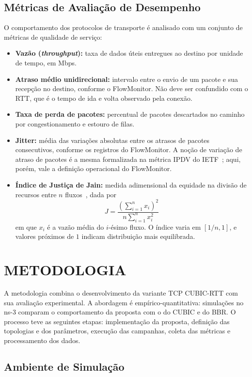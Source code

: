 \documentclass[a4paper,12pt]{monografia}
\begin{document}
\subsection{Métricas de Avaliação de Desempenho}
O comportamento dos protocolos de transporte é analisado com um conjunto de métricas de qualidade de serviço:
\begin{itemize}
    \item \textbf{Vazão (\textit{throughput}):} taxa de dados úteis entregues ao destino por unidade de tempo, em Mbps.
    \item \textbf{Atraso médio unidirecional:} intervalo entre o envio de um pacote e sua recepção no destino, conforme o FlowMonitor. Não deve ser confundido com o RTT, que é o tempo de ida e volta observado pela conexão.
    \item \textbf{Taxa de perda de pacotes:} percentual de pacotes descartados no caminho por congestionamento e estouro de filas.
    \item \textbf{Jitter:} média das variações absolutas entre os atrasos de pacotes consecutivos, conforme os registros do FlowMonitor. A noção de variação de atraso de pacotes é a mesma formalizada na métrica IPDV do IETF~\cite{rfc3393}; aqui, porém, vale a definição operacional do FlowMonitor.
    \item \textbf{Índice de Justiça de Jain:} medida adimensional da equidade na divisão de recursos entre $n$ fluxos~\cite{jain1984}, dada por
    \begin{equation}
        J = \frac{\left( \sum_{i=1}^{n} x_i \right)^2}{n \sum_{i=1}^{n} x_i^2}
    \end{equation}
    em que $x_i$ é a vazão média do $i$-ésimo fluxo. O índice varia em $[1/n, 1]$, e valores próximos de $1$ indicam distribuição mais equilibrada.
\end{itemize}

\section{METODOLOGIA}

A metodologia combina o desenvolvimento da variante TCP CUBIC-RTT com sua avaliação experimental. A abordagem é empírico-quantitativa: simulações no ns-3 comparam o comportamento da proposta com o do CUBIC e do BBR. O processo teve as seguintes etapas: implementação da proposta, definição das topologias e dos parâmetros, execução das campanhas, coleta das métricas e processamento dos dados.

\subsection{Ambiente de Simulação}
\end{document}
